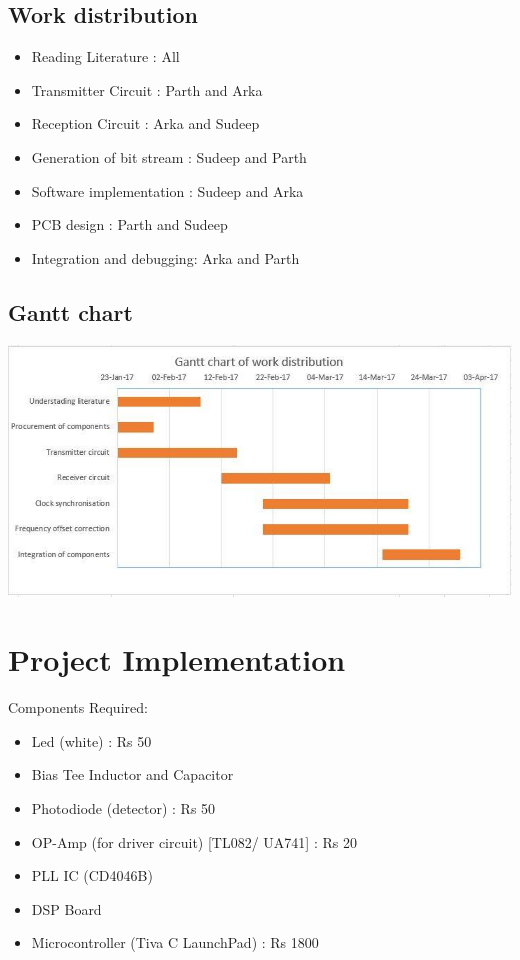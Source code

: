 \documentclass{article}
\begin{document}
\subsection{Work distribution}
\begin{itemize}
\item Reading Literature : All
\item Transmitter Circuit : Parth and Arka
\item Reception Circuit : Arka and Sudeep
\item Generation of bit stream :  Sudeep and Parth
\item Software implementation : Sudeep and Arka
\item PCB  design : Parth and Sudeep
\item Integration and debugging:  Arka and Parth
\end{itemize}

\subsection{Gantt chart}
\includegraphics[scale=0.5]{Gantt_chart}
\section{Project Implementation}
Components Required:
\begin{itemize}
\item Led (white) : Rs 50
\item Bias Tee Inductor and Capacitor
\item Photodiode (detector) : Rs 50
\item OP-Amp (for driver circuit) [TL082/ UA741] : Rs 20
\item PLL IC (CD4046B)
\item DSP Board 
\item Microcontroller (Tiva C LaunchPad) : Rs 1800
\end{itemize}
\end{document}
